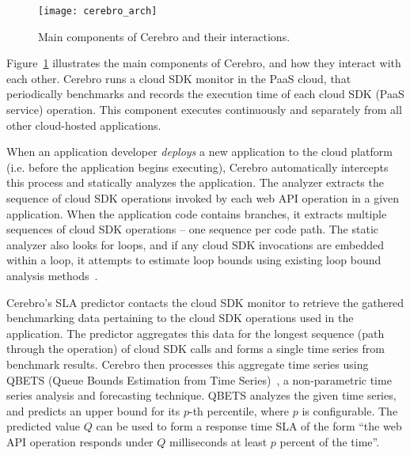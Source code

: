 \begin{figure}
\centering
\texttt{[image: cerebro\_arch]}
\caption{Main components of Cerebro and their interactions.}
\label{fig:cerebro_arch}
\vspace{-0.2in}
\end{figure}

Figure~\ref{fig:cerebro_arch} illustrates the main components of Cerebro, and how they interact with
each other. Cerebro runs a cloud SDK monitor in the PaaS cloud, that periodically benchmarks and records
the execution time of each cloud SDK (PaaS service) operation.
This component executes continuously and separately from all other cloud-hosted applications.

When an application developer \textit{deploys} a new
application to the cloud platform (i.e. before the application begins
executing),
Cerebro automatically intercepts this process and statically analyzes the 
application.  The analyzer extracts the sequence of cloud SDK operations invoked by each
web API operation in a given application. When the application code contains branches, it
extracts multiple sequences of cloud SDK operations -- one sequence per code path. The static
analyzer also looks for loops, and if any cloud SDK invocations are embedded within a loop, 
it attempts to estimate loop bounds using existing loop bound analysis methods~\cite{bygde2010static}. 

Cerebro's SLA predictor contacts the cloud SDK monitor to retrieve the gathered benchmarking data
pertaining to the cloud SDK operations used in the application. The predictor aggregates
this data for the longest sequence (path through the operation) of cloud SDK calls and 
forms a single time series from benchmark results. 
Cerebro then processes this aggregate time series using QBETS (Queue
Bounds Estimation from Time Series)~\cite{Nurmi:2007:QQB:1791551.1791556}, a 
non-parametric time series analysis and forecasting technique. QBETS analyzes the given time 
series, and predicts an upper bound for its $p$-th percentile, where $p$ is configurable. The predicted
value $Q$ can be used to form a response time SLA of the form ``the web API operation responds 
under $Q$ milliseconds at least $p$ percent of the time''.

